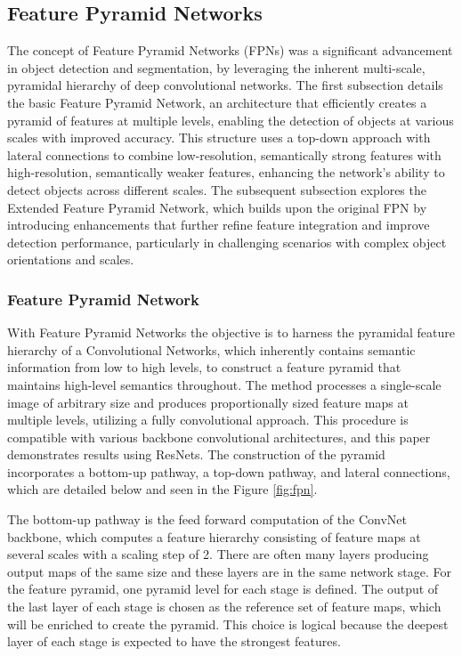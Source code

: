 \subsection{Feature Pyramid Networks}

The concept of Feature Pyramid Networks (FPNs) was a significant advancement in object detection and segmentation, by leveraging the inherent multi-scale, 
pyramidal hierarchy of deep convolutional networks. The first subsection details the basic Feature Pyramid Network, an architecture that efficiently creates 
a pyramid of features at multiple levels, enabling the detection of objects at various scales with improved accuracy. This structure uses a top-down approach 
with lateral connections to combine low-resolution, semantically strong features with high-resolution, semantically weaker features, enhancing the network’s 
ability to detect objects across different scales. The subsequent subsection explores the Extended Feature Pyramid Network, which builds upon the original FPN 
by introducing enhancements that further refine feature integration and improve detection performance, particularly in challenging scenarios with complex object 
orientations and scales.


\subsubsection{Feature Pyramid Network}

With Feature Pyramid Networks the objective is to harness the pyramidal feature hierarchy of a Convolutional Networks, which inherently contains semantic 
information from low to high levels, to construct a feature pyramid that maintains high-level semantics throughout. The method processes a single-scale 
image of arbitrary size and produces proportionally sized feature maps at multiple levels, utilizing a fully convolutional approach. This procedure is 
compatible with various backbone convolutional architectures, and this paper demonstrates results using ResNets. The construction of the pyramid incorporates 
a bottom-up pathway, a top-down pathway, and lateral connections, which are detailed below and seen in the Figure \ref{fig:fpn}.

The bottom-up pathway is the feed forward computation of the ConvNet backbone, which computes a feature hierarchy consisting of feature maps at several scales 
with a scaling step of 2. There are often many layers producing output maps of the same size and these layers are in the same network stage. For the 
feature pyramid, one pyramid level for each stage is defined. The output of the last layer of each stage is chosen as the reference set of feature maps, 
which will be enriched to create the pyramid. This choice is logical because the deepest layer of each stage is expected to have the strongest features.

